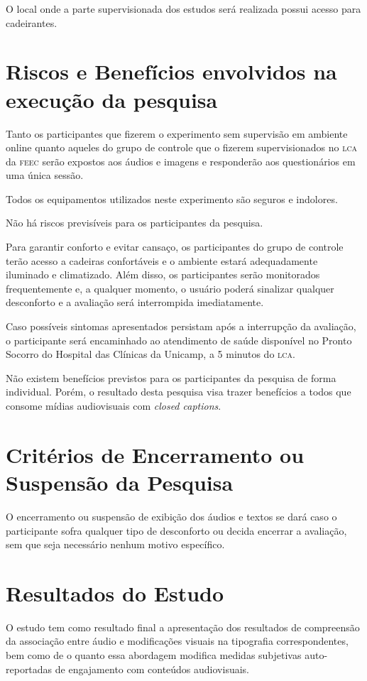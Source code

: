 \documentclass[a4paper,11pt,titlepage,singlespacing]{article}
\begin{document}
O local onde a parte supervisionada dos estudos será realizada possui acesso para cadeirantes.

\section{Riscos e Benefícios envolvidos na execução da pesquisa}
\noindent Tanto os participantes que fizerem o experimento sem supervisão em ambiente online quanto aqueles do grupo de controle que o fizerem supervisionados no \textsc{lca} da \textsc{feec} serão expostos aos áudios e imagens e responderão aos questionários em uma única sessão.

Todos os equipamentos utilizados neste experimento são seguros e indolores. 

Não há riscos previsíveis para os participantes da pesquisa.

Para garantir conforto e evitar cansaço, os participantes do grupo de controle terão acesso a cadeiras confortáveis e o ambiente estará adequadamente iluminado e climatizado. Além disso, os participantes serão monitorados frequentemente e, a qualquer momento, o usuário poderá sinalizar qualquer desconforto e a avaliação será interrompida imediatamente. 

Caso possíveis sintomas apresentados persistam após a interrupção da avaliação, o participante será encaminhado ao atendimento de saúde disponível no Pronto Socorro do Hospital das Clínicas da Unicamp, a 5 minutos do \textsc{lca}.

Não existem benefícios previstos para os participantes da pesquisa de forma individual. Porém, o resultado desta pesquisa visa trazer benefícios a todos que consome mídias audiovisuais com \textit{closed captions}.

\section{Critérios de Encerramento ou Suspensão da Pesquisa}
\noindent O encerramento ou suspensão de exibição dos áudios e textos se dará caso o participante sofra qualquer tipo de desconforto ou decida encerrar a avaliação, sem que seja necessário nenhum motivo específico. 

\section{Resultados do Estudo}
\noindent O estudo tem como resultado final a apresentação dos resultados de compreensão da associação entre áudio e modificações visuais na tipografia correspondentes, bem como de o quanto essa abordagem modifica medidas subjetivas auto-reportadas de engajamento com conteúdos audiovisuais.
\end{document}

